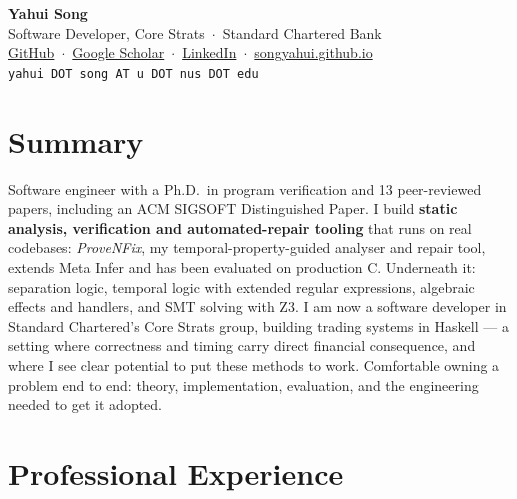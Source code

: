 \documentclass[11pt, a4paper]{article}
\begin{document}
\begin{center}
  {\LARGE\bfseries\color{heading} Yahui Song}\\[6pt]
  {\color{clrmuted} Software Developer, Core Strats\ $\cdot$\ Standard Chartered Bank}\\[4pt]
  \href{https://github.com/songyahui}{GitHub}\ $\cdot$\
  \href{https://scholar.google.com/citations?user=_OglTEAAAAAJ&hl}{Google Scholar}\ $\cdot$\
  \href{https://www.linkedin.com/in/yahui-song-667047179/}{LinkedIn}\ $\cdot$\
  \href{https://songyahui.github.io}{songyahui.github.io}\\
  {\small\texttt{yahui DOT song AT u DOT nus DOT edu}}
\end{center}

\vspace{6pt}

\section{Summary}
  Software engineer with a Ph.D.\ in program verification and 13 peer-reviewed papers, including an
  ACM SIGSOFT Distinguished Paper. I build \textbf{static analysis, verification and automated-repair
  tooling} that runs on real codebases: \emph{ProveNFix}, my temporal-property-guided analyser and
  repair tool, extends Meta Infer and has been evaluated on production C. Underneath it: separation
  logic, temporal logic with extended regular expressions, algebraic effects and handlers,
  and SMT solving with Z3. I am now a software developer in Standard
  Chartered's Core Strats group, building trading systems in Haskell --- a setting where correctness
  and timing carry direct financial consequence, and where I see clear potential to put these methods
  to work. Comfortable owning a problem end to end: theory, implementation, evaluation, and the
  engineering needed to get it adopted.


\section{Professional Experience}
\end{document}
